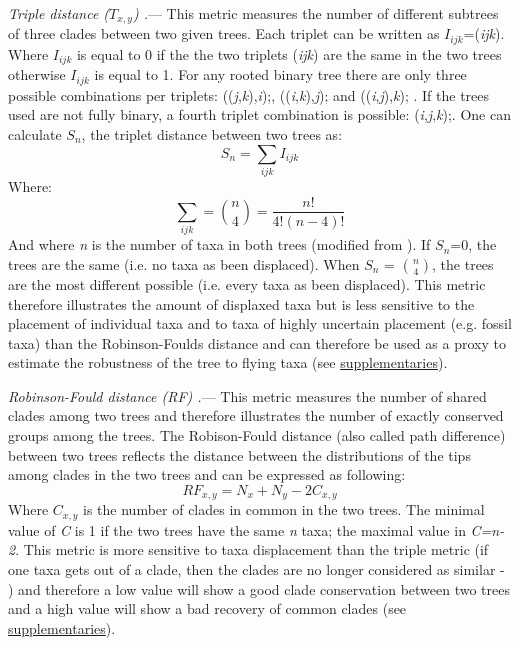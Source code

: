\documentclass[12pt,letterpaper]{article}
\renewcommand{\subsubsection}[1]{%
\vspace{2ex}
\noindent
\textit{#1.}---}
\begin{document}
\subsubsection{Triple distance ($T_{x,y}$) \citep{dobson1975triplets}}
This metric measures the number of different subtrees of three clades between two given trees.
Each triplet can be written as $I_{ijk}$=(\textit{ijk}).
Where $I_{ijk}$ is equal to 0 if the the two triplets (\textit{ijk}) are the same in the two trees otherwise $I_{ijk}$ is equal to 1.
For any rooted binary tree there are only three possible combinations per triplets: ((\textit{j},\textit{k}),\textit{i});, ((\textit{i},\textit{k}),\textit{j}); and ((\textit{i},\textit{j}),\textit{k}); \citep{johnson1998}.
If the trees used are not fully binary, a fourth triplet combination is possible: (\textit{i},\textit{j},\textit{k});.
One can calculate $S_n$, the triplet distance between two trees as:
\begin{equation}
S_n = \sum_{ijk} I_{ijk}
\end{equation}
Where:
\begin{equation}
\sum_{ijk} = \binom{n}{4} = \frac{n!}{4!(n-4)!}
\end{equation}
And where \textit{n} is the number of taxa in both trees (modified from \citet{critchlowthe1996}).
If $S_n$=0, the trees are the same (i.e. no taxa as been displaced). When $S_n$ = $\binom{n}{4}$, the trees are the most different possible (i.e. every taxa as been displaced).
This metric therefore illustrates the amount of displaxed taxa but is less sensitive to the placement of individual taxa and to taxa of highly uncertain placement (e.g. fossil taxa) than the Robinson-Foulds distance \citep{critchlowthe1996,johnson1998,wiensmissing2003} and can therefore be used as a proxy to estimate the robustness of the tree to flying taxa (see \hyperref[supplementaries]{supplementaries}).

\subsubsection{Robinson-Fould distance (\textit{RF}) \citep{RF1981}}
This metric measures the number of shared clades among two trees and therefore illustrates the number of exactly conserved groups among the trees.
The Robison-Fould distance (also called path difference) between two trees reflects the distance between the distributions of the tips among clades in the two trees \citep{RF1981} and can be expressed as following:
\begin{equation}
RF_{x,y} = N_{x} + N_{y} - 2C_{x,y}
\end{equation}
Where $C_{x,y}$ is the number of clades in common in the two trees.
The minimal value of \textit{C} is 1 if the two trees have the same \textit{n} taxa; the maximal value in \textit{C=n-2}.
This metric is more sensitive to taxa displacement than the triple metric (if one taxa gets out of a clade, then the clades are no longer considered as similar - \citet{critchlowthe1996,johnson1998,wiensmissing2003}) and therefore a low value will show a good clade conservation between two trees and a high value will show a bad recovery of common clades (see \hyperref[supplementaries]{supplementaries}).
\end{document}
